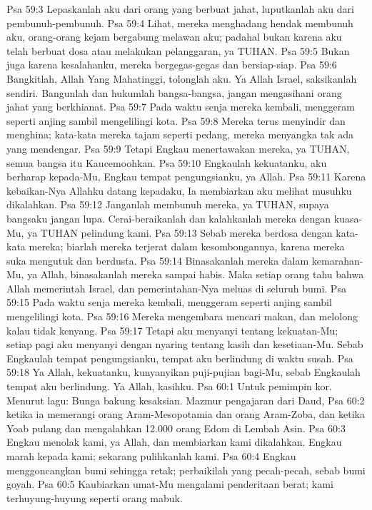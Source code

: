 Psa 59:3  Lepaskanlah aku dari orang yang berbuat jahat, luputkanlah aku dari pembunuh-pembunuh.
Psa 59:4  Lihat, mereka menghadang hendak membunuh aku, orang-orang kejam bergabung melawan aku; padahal bukan karena aku telah berbuat dosa atau melakukan pelanggaran, ya TUHAN.
Psa 59:5  Bukan juga karena kesalahanku, mereka bergegas-gegas dan bersiap-siap.
Psa 59:6  Bangkitlah, Allah Yang Mahatinggi, tolonglah aku. Ya Allah Israel, saksikanlah sendiri. Bangunlah dan hukumlah bangsa-bangsa, jangan mengasihani orang jahat yang berkhianat.
Psa 59:7  Pada waktu senja mereka kembali, menggeram seperti anjing sambil mengelilingi kota.
Psa 59:8  Mereka terus menyindir dan menghina; kata-kata mereka tajam seperti pedang, mereka menyangka tak ada yang mendengar.
Psa 59:9  Tetapi Engkau menertawakan mereka, ya TUHAN, semua bangsa itu Kaucemoohkan.
Psa 59:10  Engkaulah kekuatanku, aku berharap kepada-Mu, Engkau tempat pengungsianku, ya Allah.
Psa 59:11  Karena kebaikan-Nya Allahku datang kepadaku, Ia membiarkan aku melihat musuhku dikalahkan.
Psa 59:12  Janganlah membunuh mereka, ya TUHAN, supaya bangsaku jangan lupa. Cerai-beraikanlah dan kalahkanlah mereka dengan kuasa-Mu, ya TUHAN pelindung kami.
Psa 59:13  Sebab mereka berdosa dengan kata-kata mereka; biarlah mereka terjerat dalam kesombongannya, karena mereka suka mengutuk dan berdusta.
Psa 59:14  Binasakanlah mereka dalam kemarahan-Mu, ya Allah, binasakanlah mereka sampai habis. Maka setiap orang tahu bahwa Allah memerintah Israel, dan pemerintahan-Nya meluas di seluruh bumi.
Psa 59:15  Pada waktu senja mereka kembali, menggeram seperti anjing sambil mengelilingi kota.
Psa 59:16  Mereka mengembara mencari makan, dan melolong kalau tidak kenyang.
Psa 59:17  Tetapi aku menyanyi tentang kekuatan-Mu; setiap pagi aku menyanyi dengan nyaring tentang kasih dan kesetiaan-Mu. Sebab Engkaulah tempat pengungsianku, tempat aku berlindung di waktu susah.
Psa 59:18  Ya Allah, kekuatanku, kunyanyikan puji-pujian bagi-Mu, sebab Engkaulah tempat aku berlindung. Ya Allah, kasihku.
Psa 60:1  Untuk pemimpin kor. Menurut lagu: Bunga bakung kesaksian. Mazmur pengajaran dari Daud,
Psa 60:2  ketika ia memerangi orang Aram-Mesopotamia dan orang Aram-Zoba, dan ketika Yoab pulang dan mengalahkan 12.000 orang Edom di Lembah Asin.
Psa 60:3  Engkau menolak kami, ya Allah, dan membiarkan kami dikalahkan. Engkau marah kepada kami; sekarang pulihkanlah kami.
Psa 60:4  Engkau menggoncangkan bumi sehingga retak; perbaikilah yang pecah-pecah, sebab bumi goyah.
Psa 60:5  Kaubiarkan umat-Mu mengalami penderitaan berat; kami terhuyung-huyung seperti orang mabuk.
